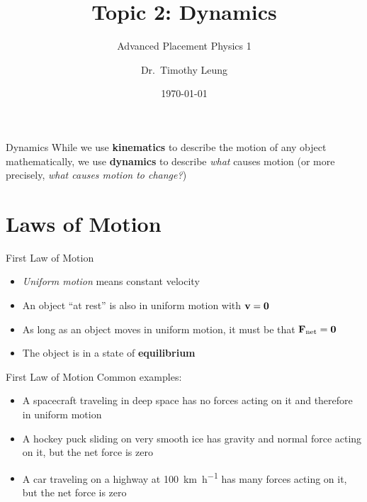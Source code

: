 \documentclass[12pt,compress,aspectratio=169]{beamer}
\title{Topic 2: Dynamics}
\subtitle{Advanced Placement Physics 1}
\author[TML]{Dr.\ Timothy Leung}
\institute{Olympiads School}
\date{\today}
\newcommand{\mb}[1]{\ensuremath\mathbf{#1}}
\begin{document}
\begin{frame}
  \maketitle
\end{frame}

\begin{frame}{Dynamics}
  While we use \textbf{kinematics} to describe the motion of any object
  mathematically, we use \textbf{dynamics} to describe \emph{what} causes
  motion (or more precisely, \emph{what causes motion to change?})
\end{frame}



\section{Laws of Motion}

\begin{frame}{First Law of Motion}
  \begin{center}
  \end{center}
  \begin{itemize}
  \item \emph{Uniform motion} means constant velocity
  \item An object ``at rest'' is also in uniform motion with $\mb{v}=\mb{0}$
  \item As long as an object moves in uniform motion, it must be that
    $\mb{F}_\text{net}=\mb{0}$
  \item The object is in a state of \textbf{equilibrium}
  \end{itemize}
\end{frame}



\begin{frame}{First Law of Motion}
  Common examples:
  \begin{itemize}
  \item A spacecraft traveling in deep space has no forces acting on it
    and therefore in uniform motion
  \item A hockey puck sliding on very smooth ice has gravity and normal
    force acting on it, but the net force is zero
  \item A car traveling on a highway at \SI{100}{\kilo\metre\per\hour}
    has many forces acting on it, but the net force is zero 
  \end{itemize}
\end{frame}
\end{document}
